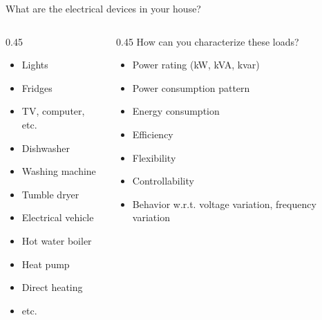 \begin{frame}{What are the electrical devices in your house?}
\begin{columns}
  \begin{column}{0.45\textwidth}
    \begin{itemize}
      \item Lights
      \item Fridges
      \item TV, computer, etc.
      \item Dishwasher
      \item Washing machine
      \item Tumble dryer
      \item Electrical vehicle
      \item Hot water boiler
      \item Heat pump
      \item Direct heating
      \item etc.
    \end{itemize}  
  \end{column}
  \begin{column}{0.45\textwidth}
    How can you characterize these loads?
    \begin{itemize}
      \item Power rating (kW, kVA, kvar)
      \item Power consumption pattern
      \item Energy consumption
      \item Efficiency
      \item Flexibility
      \item Controllability
      \item Behavior w.r.t. voltage variation, frequency variation
    \end{itemize}
  \end{column}
\end{columns}
\end{frame} 

